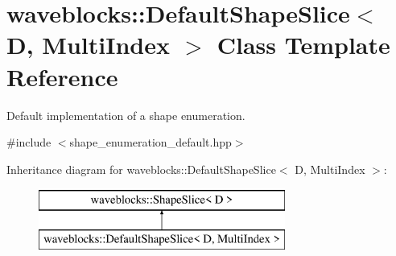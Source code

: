 \hypertarget{classwaveblocks_1_1_default_shape_slice}{}\section{waveblocks\+:\+:Default\+Shape\+Slice$<$ D, Multi\+Index $>$ Class Template Reference}
\label{classwaveblocks_1_1_default_shape_slice}


Default implementation of a shape enumeration.  




{\ttfamily \#include $<$shape\+\_\+enumeration\+\_\+default.\+hpp$>$}

Inheritance diagram for waveblocks\+:\+:Default\+Shape\+Slice$<$ D, Multi\+Index $>$\+:\begin{figure}[H]
\begin{center}
\leavevmode
\includegraphics[height=2.000000cm]{classwaveblocks_1_1_default_shape_slice}
\end{center}
\end{figure}
